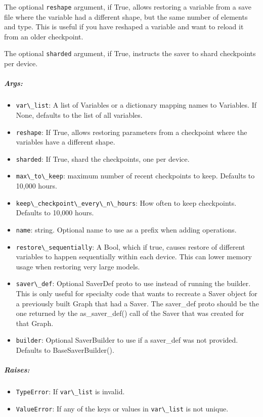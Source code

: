 The optional \lstinline{reshape} argument, if True, allows restoring a
variable from a save file where the variable had a different shape, but
the same number of elements and type. This is useful if you have
reshaped a variable and want to reload it from an older checkpoint.

The optional \lstinline{sharded} argument, if True, instructs the saver to
shard checkpoints per device.

\subparagraph{Args: }\label{args-9}

\begin{itemize}
\tightlist
\item
  \lstinline{var\_list}: A list of Variables or a dictionary mapping names
  to Variables. If None, defaults to the list of all variables.
\item
  \lstinline{reshape}: If True, allows restoring parameters from a
  checkpoint where the variables have a different shape.
\item
  \lstinline{sharded}: If True, shard the checkpoints, one per device.
\item
  \lstinline{max\_to\_keep}: maximum number of recent checkpoints to keep.
  Defaults to 10,000 hours.
\item
  \lstinline{keep\_checkpoint\_every\_n\_hours}: How often to keep
  checkpoints. Defaults to 10,000 hours.
\item
  \lstinline{name}: string. Optional name to use as a prefix when adding
  operations.
\item
  \lstinline{restore\_sequentially}: A Bool, which if true, causes restore
  of different variables to happen sequentially within each device. This
  can lower memory usage when restoring very large models.
\item
  \lstinline{saver\_def}: Optional SaverDef proto to use instead of running
  the builder. This is only useful for specialty code that wants to
  recreate a Saver object for a previously built Graph that had a Saver.
  The saver\_def proto should be the one returned by the
  as\_saver\_def() call of the Saver that was created for that Graph.
\item
  \lstinline{builder}: Optional SaverBuilder to use if a saver\_def was not
  provided. Defaults to BaseSaverBuilder().
\end{itemize}

\subparagraph{Raises: }\label{raises-2}

\begin{itemize}
\tightlist
\item
  \lstinline{TypeError}: If \lstinline{var\_list} is invalid.
\item
  \lstinline{ValueError}: If any of the keys or values in
  \lstinline{var\_list} is not unique.
\end{itemize}

